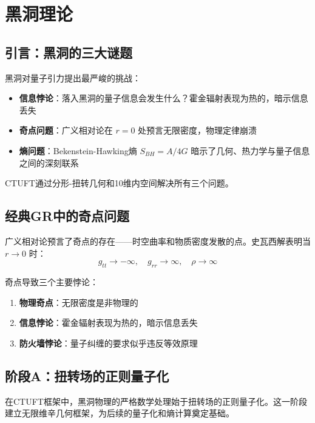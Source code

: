 \section{黑洞理论}
\label{sec:bh}

\subsection{引言：黑洞的三大谜题}

黑洞对量子引力提出最严峻的挑战：
\begin{itemize}
    \item \textbf{信息悖论}：落入黑洞的量子信息会发生什么？霍金辐射表现为热的，暗示信息丢失
    \item \textbf{奇点问题}：广义相对论在 $r = 0$ 处预言无限密度，物理定律崩溃
    \item \textbf{熵问题}：Bekenstein-Hawking熵 $S_{BH} = A/4G$ 暗示了几何、热力学与量子信息之间的深刻联系
\end{itemize}

CTUFT通过分形-扭转几何和10维内空间解决所有三个问题。

\subsection{经典GR中的奇点问题}

广义相对论预言了奇点的存在——时空曲率和物质密度发散的点。史瓦西解表明当 $r \to 0$ 时：
\begin{equation}
    g_{tt} \to -\infty, \quad g_{rr} \to \infty, \quad \rho \to \infty
\end{equation}

奇点导致三个主要悖论：
\begin{enumerate}
    \item \textbf{物理奇点}：无限密度是非物理的
    \item \textbf{信息悖论}：霍金辐射表现为热的，暗示信息丢失
    \item \textbf{防火墙悖论}：量子纠缠的要求似乎违反等效原理
\end{enumerate}

\subsection{阶段A：扭转场的正则量子化}
\label{subsec:stageA_canonical}

在CTUFT框架中，黑洞物理的严格数学处理始于扭转场的正则量子化。这一阶段建立无限维辛几何框架，为后续的量子化和熵计算奠定基础。

